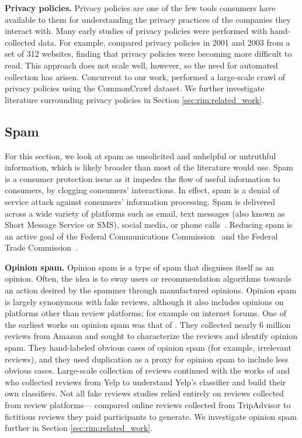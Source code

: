\textbf{Privacy policies.} Privacy policies are one of the few tools consumers have available to them for understanding the privacy practices of the companies they interact with. Many early studies of privacy policies were performed with hand-collected data. For example, \citet{milne2006longitudinal} compared privacy policies in 2001 and 2003 from a set of 312 websites, finding that privacy policies were becoming more difficult to read. This approach does not scale well, however, so the need for automated collection has arisen. Concurrent to our work, \citet{srinath2020} performed a large-scale crawl of privacy policies using the CommonCrawl dataset. We further investigate literature surrounding privacy policies in Section \ref{sec:rim:related_work}.


\subsection{Spam} 
For this section, we look at spam as unsolicited and unhelpful or untruthful information, which is likely broader than most of the literature would use. Spam is a consumer protection issue as it impedes the flow of useful information to consumers, by clogging consumers' interactions. In effect, spam is a denial of service attack against consumers' information processing. Spam is delivered across a wide variety of platforms such as email, text messages (also known as Short Message Service or SMS), social media, or phone calls~\cite{malwarebytesspam}. Reducing spam is an active goal of the Federal Communications Commission~\cite{fcc2021acting} and the Federal Trade Commission~\cite{ftc2021canspam,ftc21notice}.


\textbf{Opinion spam.}
Opinion spam is a type of spam that disguises itself as an opinion. Often, the idea is to sway users or recommendation algorithms towards an action desired by the spammer through manufactured opinions. Opinion spam is largely synonymous with fake reviews, although it also includes opinions on platforms other than review platforms; for example on internet forums. One of the earliest works on opinion spam was that of \citet{jindal2008opinion}. They collected nearly 6 million reviews from Amazon and sought to characterize the reviews and identify opinion spam. They hand-labeled obvious cases of opinion spam (for example, irrelevant reviews), and they used duplication as a proxy for opinion spam to include less obvious cases. Large-scale collection of reviews continued with the works of \citet{mukherjee2013yelp} and \citet{rayana2015collective} who collected reviews from Yelp to understand Yelp's classifier and build their own classifiers. Not all fake reviews studies relied entirely on reviews collected from review platforms---\citet{ott2011finding} compared online reviews collected from TripAdvisor to fictitious reviews they paid participants to generate. We investigate opinion spam further in Section \ref{sec:rim:related_work}.

